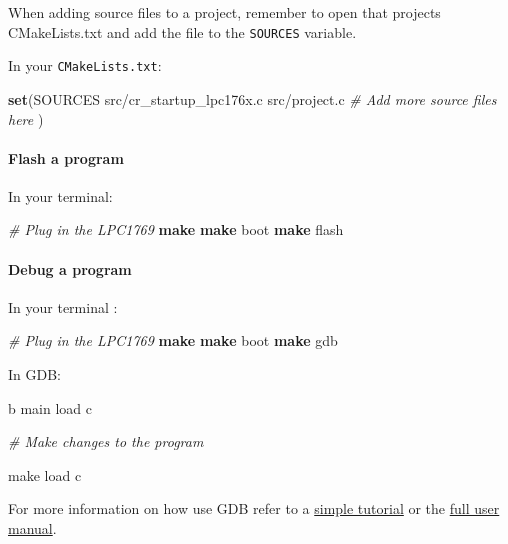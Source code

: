 \documentclass[]{article}
\newenvironment{Shaded}{\begin{snugshade}}{\end{snugshade}}
\newcommand{\KeywordTok}[1]{\textcolor[rgb]{0.13,0.29,0.53}{\textbf{{#1}}}}
\newcommand{\CommentTok}[1]{\textcolor[rgb]{0.56,0.35,0.01}{\textit{{#1}}}}
\newcommand{\OtherTok}[1]{\textcolor[rgb]{0.56,0.35,0.01}{{#1}}}
\newcommand{\NormalTok}[1]{{#1}}
\begin{document}
When adding source files to a project, remember to open that projects
CMakeLists.txt and add the file to the \texttt{SOURCES} variable.

In your \texttt{CMakeLists.txt}:

\begin{Shaded}
\begin{Highlighting}[]
    \KeywordTok{set}\NormalTok{(}\OtherTok{SOURCES}
      \NormalTok{src/cr_startup_lpc176x.c}
      \NormalTok{src/project.c}
      \CommentTok{# Add more source files here}
    \NormalTok{)}
\end{Highlighting}
\end{Shaded}

\paragraph{Flash a program}

In your terminal:

\begin{Shaded}
\begin{Highlighting}[]
    \CommentTok{# Plug in the LPC1769}
    \KeywordTok{make}
    \KeywordTok{make} \NormalTok{boot}
    \KeywordTok{make} \NormalTok{flash}
\end{Highlighting}
\end{Shaded}

\paragraph{Debug a program}

In your terminal :

\begin{Shaded}
\begin{Highlighting}[]
    \CommentTok{# Plug in the LPC1769}
    \KeywordTok{make}
    \KeywordTok{make} \NormalTok{boot}
    \KeywordTok{make} \NormalTok{gdb}
\end{Highlighting}
\end{Shaded}

In GDB:

\begin{Shaded}
\begin{Highlighting}[]
    \NormalTok{b main}
    \NormalTok{load}
    \NormalTok{c}

    \CommentTok{# Make changes to the program}

    \NormalTok{make}
    \NormalTok{load}
    \NormalTok{c}
\end{Highlighting}
\end{Shaded}

For more information on how use GDB refer to a
\href{http://www.cs.cmu.edu/~gilpin/tutorial/}{simple tutorial} or the
\href{https://sourceware.org/gdb/current/onlinedocs/gdb/}{full user
manual}.

\newpage

\todototoc
\listoftodos
\end{document}
